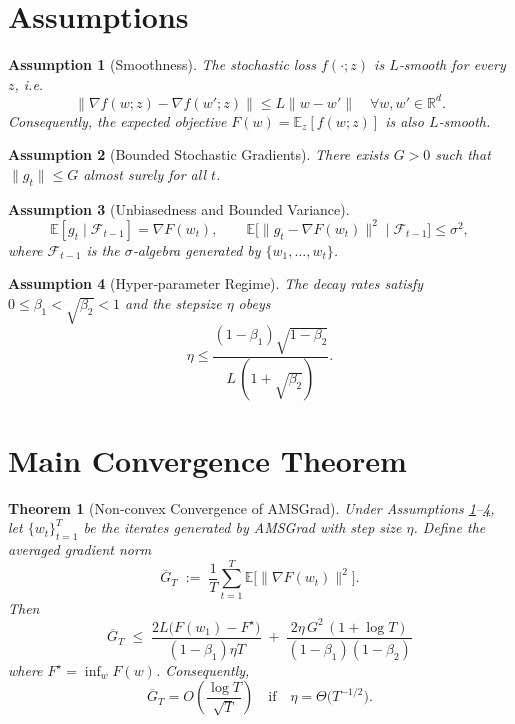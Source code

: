 \documentclass{article}
\newtheorem{theorem}{Theorem}
\newtheorem{assumption}{Assumption}
\newcommand{\E}{\mathbb{E}}
\newcommand{\R}{\mathbb{R}}
\begin{document}
\section*{Assumptions}
\begin{assumption}[Smoothness]\label{as:smooth}
The stochastic loss $f(\cdot;z)$ is $L$‑smooth for every $z$, i.e.
\[
\|\nabla f(w;z)-\nabla f(w';z)\|\le L\|w-w'\|\quad\forall w,w'\in\R^{d}.
\]
Consequently, the expected objective $F(w)=\E_z[f(w;z)]$ is also $L$‑smooth.
\end{assumption}
\begin{assumption}[Bounded Stochastic Gradients]\label{as:bound}
There exists $G>0$ such that $\|g_t\|\le G$ almost surely for all $t$.
\end{assumption}
\begin{assumption}[Unbiasedness and Bounded Variance]\label{as:unbiased}
\[
\E[g_t\mid\mathcal{F}_{t-1}]=\nabla F(w_t),\qquad
\E\bigl[\|g_t-\nabla F(w_t)\|^2\mid\mathcal{F}_{t-1}\bigr]\le\sigma^2,
\]
where $\mathcal{F}_{t-1}$ is the $\sigma$‑algebra generated by $\{w_1,\dots,w_t\}$.
\end{assumption}
\begin{assumption}[Hyper‑parameter Regime]\label{as:hyper}
The decay rates satisfy $0\le\beta_1<\sqrt{\beta_2}<1$ and the stepsize $\eta$ obeys
\[
\eta \le \frac{(1-\beta_1)\sqrt{1-\beta_2}}{L\,(1+\sqrt{\beta_2})}.
\]
\end{assumption}

\section*{Main Convergence Theorem}
\begin{theorem}[Non‑convex Convergence of AMSGrad]\label{thm:main}
Under Assumptions \ref{as:smooth}–\ref{as:hyper}, let $\{w_t\}_{t=1}^{T}$ be the iterates generated by AMSGrad with step size $\eta$. Define the averaged gradient norm
\[
\overline{G}_T \;:=\; \frac{1}{T}\sum_{t=1}^{T}\E\bigl[\|\nabla F(w_t)\|^2\bigr].
\]
Then
\[
\boxed{\;
\overline{G}_T \;\le\;
\frac{2L\bigl(F(w_1)-F^\star\bigr)}{(1-\beta_1)\eta T}
\;+\;
\frac{2\eta\,G^2\,(1+\log T)}{(1-\beta_1)(1-\beta_2)}\;
}
\tag{6}
\]
where $F^\star=\inf_{w}F(w)$. Consequently,
\[
\overline{G}_T = O\!\left(\frac{\log T}{\sqrt{T}}\right)
\quad\text{if}\quad
\eta = \Theta\!\bigl(T^{-1/2}\bigr).
\]
\end{theorem}
\end{document}
